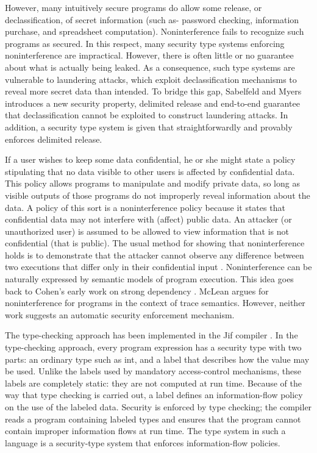 However, many intuitively secure programs do allow some release, or declassification, of secret information (such as- password checking, information purchase, and spreadsheet computation). Noninterference fails to recognize such programs as secured. In this respect, many security type systems enforcing noninterference are impractical. However, there is often little or no guarantee about what is actually being leaked. As a consequence, such type systems are vulnerable to laundering attacks, which exploit declassification mechanisms to reveal more secret data than intended. To bridge this gap, Sabelfeld and Myers
\cite{ref_72_sabelfeld2004model} introduces a new security property, delimited release and end-to-end guarantee that declassification cannot be exploited to construct laundering attacks. In addition, a security type system is given that straightforwardly and provably enforces delimited release.

If a user wishes to keep some data confidential, he or
she might state a policy stipulating that no data visible
to other users is affected by confidential data. This policy
allows programs to manipulate and modify private data, so
long as visible outputs of those programs do not improperly
reveal information about the data. A policy of this sort is a
noninterference policy \cite{ref_65_goguen1982security} because it states that confidential
data may not interfere with (affect) public data. An attacker (or unauthorized user) is assumed to be allowed
to view information that is not confidential (that is public).
The usual method for showing that noninterference holds is
to demonstrate that the attacker cannot observe any difference
between two executions that differ only in their confidential
input \cite{ref_66_goguen1984unwinding}. Noninterference can be naturally expressed by
semantic models of program execution. This idea goes back
to Cohen's early work on strong dependency \cite{ref_67_cohen1977information,ref_6_cohen1978information}.
McLean \cite{ref_69_mclean1992proving} argues for noninterference for programs in the
context of trace semantics. However, neither work suggests an
automatic security enforcement mechanism.

The type-checking approach has been implemented
in the Jif compiler \cite{ref_48_chong:jif,ref_40_myers:jflow}.
In the type-checking approach, every program expression
has a security type with two parts: an ordinary type such as int,
and a label that describes how the value may be used. Unlike
the labels used by mandatory access-control mechanisms,
these labels are completely static: they are not computed at
run time. Because of the way that type checking is carried
out, a label defines an information-flow policy on the use of
the labeled data. Security is enforced by type checking; the
compiler reads a program containing labeled types and ensures that the program cannot contain
improper information flows at run time. The type system
in such a language is a security-type system that enforces
information-flow policies.

